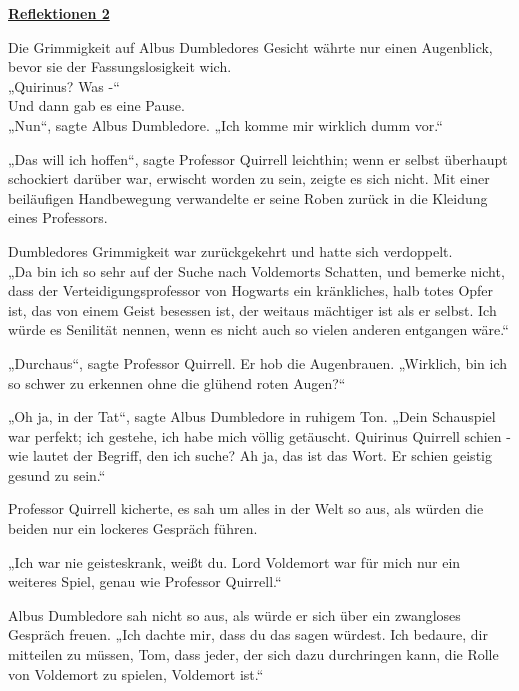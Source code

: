 

\hypertarget{reflektionen-2}{%

\textbf{\uline{Reflektionen 2}}

Die Grimmigkeit auf Albus Dumbledores Gesicht währte nur einen Augenblick, bevor sie der Fassungslosigkeit wich.\\ „Quirinus? Was -“\\ Und dann gab es eine Pause.\\ „Nun“, sagte Albus Dumbledore. „Ich komme mir wirklich dumm vor.“

„Das will ich hoffen“, sagte Professor Quirrell leichthin; wenn er selbst überhaupt schockiert darüber war, erwischt worden zu sein, zeigte es sich nicht. Mit einer beiläufigen Handbewegung verwandelte er seine Roben zurück in die Kleidung eines Professors.

Dumbledores Grimmigkeit war zurückgekehrt und hatte sich verdoppelt.\\ „Da bin ich so sehr auf der Suche nach Voldemorts Schatten, und bemerke nicht, dass der Verteidigungsprofessor von Hogwarts ein kränkliches, halb totes Opfer ist, das von einem Geist besessen ist, der weitaus mächtiger ist als er selbst. Ich würde es Senilität nennen, wenn es nicht auch so vielen anderen entgangen wäre.“

„Durchaus“, sagte Professor Quirrell. Er hob die Augenbrauen. „Wirklich, bin ich so schwer zu erkennen ohne die glühend roten Augen?“

„Oh ja, in der Tat“, sagte Albus Dumbledore in ruhigem Ton. „Dein Schauspiel war perfekt; ich gestehe, ich habe mich völlig getäuscht. Quirinus Quirrell schien - wie lautet der Begriff, den ich suche? Ah ja, das ist das Wort. Er schien geistig gesund zu sein.“

Professor Quirrell kicherte, es sah um alles in der Welt so aus, als würden die beiden nur ein lockeres Gespräch führen.

„Ich war nie geisteskrank, weißt du. Lord Voldemort war für mich nur ein weiteres Spiel, genau wie Professor Quirrell.“

Albus Dumbledore sah nicht so aus, als würde er sich über ein zwangloses Gespräch freuen. „Ich dachte mir, dass du das sagen würdest. Ich bedaure, dir mitteilen zu müssen, Tom, dass jeder, der sich dazu durchringen kann, die Rolle von Voldemort zu spielen, Voldemort ist.“

}
